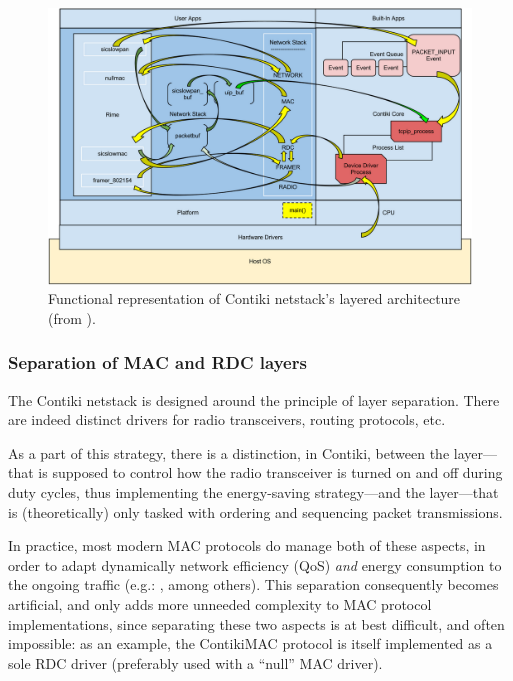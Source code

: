 \documentclass[12pt,twoside,a4paper]{article}
\begin{document}
\begin{figure}[!t]
\centering
\includegraphics[width=13.5cm]{ContikiNetstack.png}
\caption{Functional representation of Contiki netstack's layered architecture
         (from \cite{judit-blog}).}
\label{contiki-netstack}
\end{figure}


\subsubsection{Separation of MAC and RDC layers}

The Contiki netstack is designed around the principle of layer separation.
There are indeed distinct drivers for radio transceivers, routing protocols,
etc.

As a part of this strategy, there is a distinction, in Contiki, between
the  layer---that is supposed to control
how the radio transceiver is turned on and off during duty cycles, thus
implementing the energy-saving strategy---and the  layer---that is (theoretically) only tasked with
ordering and sequencing packet transmissions.

In practice, most modern MAC protocols do manage both of these aspects,
in order to adapt dynamically network efficiency (QoS) \emph{and} energy
consumption to the ongoing traffic (e.g.: \cite{x-mac} \cite{ri-mac}
\cite{cosens} \cite{iqueue-mac}, among others). This separation consequently
becomes artificial, and only adds more unneeded complexity to MAC protocol
implementations, since separating these two aspects is at best difficult,
and often impossible: as an example, the ContikiMAC protocol is itself
implemented as a sole RDC driver (preferably used with a ``null'' MAC
driver).
\end{document}
